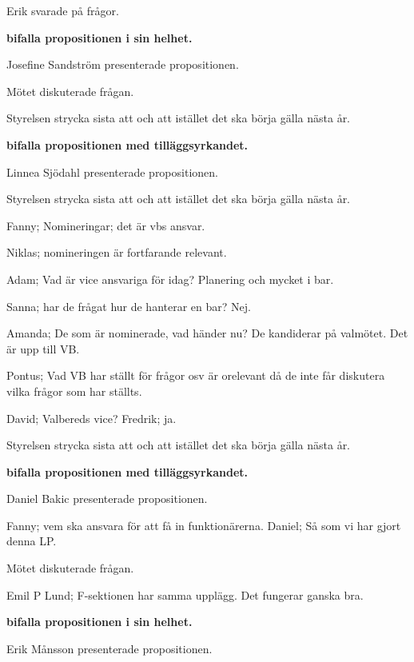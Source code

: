 \documentclass[10pt]{article}
\begin{document}
\begin{paragrafer}
\begin{paragrafer}
        Erik svarade på frågor.

        \textbf{\Mba bifalla propositionen i sin helhet.}

        Josefine Sandström presenterade propositionen.

        Mötet diskuterade frågan.

        Styrelsen \ypa strycka sista att och att istället det ska börja gälla nästa år.

        \textbf{\Mba bifalla propositionen med tilläggsyrkandet.}

        Linnea Sjödahl presenterade propositionen.

        Styrelsen \ypa strycka sista att och att istället det ska börja gälla nästa år.

        Fanny; Nomineringar; det är vbs ansvar.

        Niklas; nomineringen är fortfarande relevant.

        Adam; Vad är vice ansvariga för idag? Planering och mycket i bar.

        Sanna; har de frågat hur de hanterar en bar? Nej.

        Amanda; De som är nominerade, vad händer nu? De kandiderar på valmötet. Det är upp till VB.

        Pontus; Vad VB har ställt för frågor osv är orelevant då de inte får diskutera vilka frågor som har ställts.

        David; Valbereds vice? Fredrik; ja.

        Styrelsen \ypa strycka sista att och att istället det ska börja gälla nästa år.

        \textbf{\Mba bifalla propositionen med tilläggsyrkandet.}

        Daniel Bakic presenterade propositionen.

        Fanny; vem ska ansvara för att få in funktionärerna.
        Daniel; Så som vi har gjort denna LP.

        Mötet diskuterade frågan.

        Emil P Lund; F-sektionen har samma upplägg. Det fungerar ganska bra.

        \textbf{\Mba bifalla propositionen i sin helhet.}

        Erik Månsson presenterade propositionen.


\end{paragrafer}
\end{paragrafer}
\end{document}
